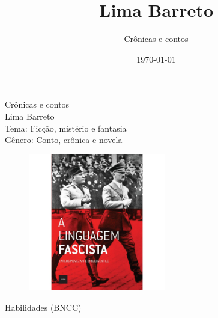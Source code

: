 \documentclass[smaller,professionalfonts,15pt]{beamer}
\author{Crônicas e contos}
\title{Lima Barreto}
\institute{Pázmány Péter Catholic University}
\date{\today}
\begin{document}


\begin{frame}
\begin{raggedleft}
\Huge Crônicas e contos\\
\huge Lima Barreto\\\bigskip
\normalsize
Tema: Ficção, mistério e fantasia\\	
Gênero: Conto, crônica e novela\\
\end{raggedleft}

\end{frame}

\begin{frame}
\begin{figure}
\hfill\includegraphics[width=6cm]{cover.jpeg}
\end{figure}
\end{frame}


\begin{frame}[plain]{Habilidades (BNCC)}
\vspace{-2cm}
\end{frame}
\end{document}
